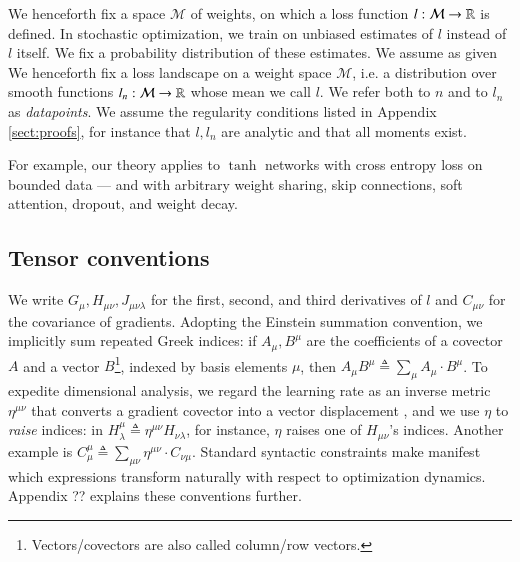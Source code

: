 \documentclass{article}
\theoremstyle{plain}
\theoremstyle{definition}
\newcommand{\Mm}{\mathcal{M}}
\begin{document}

        We henceforth fix a space $\Mm$ of weights, on which a loss function 
        $l:\Mm\to\RR$ is defined.  In stochastic optimization, we train on 
        unbiased estimates of $l$ instead of $l$ itself.  We fix a probability
        distribution of these estimates.
        We assume as given  
        We henceforth fix a loss landscape on a weight space $\Mm$, i.e. a
        distribution over smooth functions $l_n:\Mm\to\RR$ whose mean we call
        $l$.  We refer both to $n$ and to $l_n$ as \emph{datapoints}.  We
        assume the regularity conditions listed in Appendix \ref{sect:proofs},
        for instance that $l, l_n$ are analytic and that all moments exist.


        For example, our theory applies to $\tanh$ networks with cross entropy
        loss on bounded data --- and with arbitrary weight sharing, skip
        connections, soft attention, dropout, and weight decay.
        

    \subsection{Tensor conventions}
        We write $G_\mu, H_{\mu\nu}, J_{\mu\nu\lambda}$ for the first, second,
        and third derivatives of $l$ and $C_{\mu \nu}$ for the covariance of
        gradients.  Adopting the Einstein summation convention, we implicitly
        sum repeated Greek indices: if $A_\mu, B^\mu$ are the coefficients of a
        covector $A$ and a vector
        $B$\footnote{
            Vectors/covectors are also called column/row vectors.
        }, indexed by basis elements $\mu$, then
        $
            A_\mu B^\mu
            \triangleq
            \sum_\mu A_\mu \cdot B^\mu
        $.
        To expedite dimensional analysis, we regard the learning rate as an
        inverse metric $\eta^{\mu\nu}$ that converts a gradient covector into a
        vector displacement \citep{bo13}, and we use $\eta$ to \emph{raise}
        indices: in
        $
            H^{\mu}_{\lambda}
            \triangleq
            \eta^{\mu\nu} H_{\nu\lambda}
        $, for instance,
        $\eta$ raises one of $H_{\mu\nu}$'s indices.  Another example is
        $
            C^{\mu}_{\mu}
            \triangleq
            \sum_{\mu \nu} \eta^{\mu\nu} \cdot C_{\nu\mu}
        $.
        Standard syntactic constraints make manifest which expressions
        transform naturally with respect to optimization dynamics.
        Appendix ?? explains these conventions further.
\end{document}
